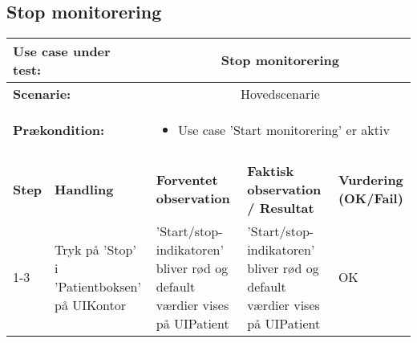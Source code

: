 \\
\subsection{Stop monitorering}
\begin{tabular}{|p{1cm}|p{3cm}|p{4cm}|p{4cm}|p{2cm}|}
\hline
\multicolumn{2}{|p{4cm}|}{\textbf{Use case under test:}} & \multicolumn{3}{c|}{Stop monitorering} \\\hline

\multicolumn{2}{|p{3cm}|}{\textbf{Scenarie:}} & \multicolumn{3}{c|}{Hovedscenarie} \\\hline

\multicolumn{2}{|p{3cm}|}{\textbf{Prækondition:}}  & \multicolumn{3}{l|}{\parbox{0.6\textwidth}{
\begin{itemize}[label=$\circ$]
\item Use case 'Start monitorering' er aktiv
\end{itemize} }}\\\hline

\multicolumn{5}{|c|}{} \\\hline

\textbf{Step} & \textbf{Handling} & \textbf{Forventet observation} & \textbf{Faktisk observation / Resultat} & \textbf{Vurdering (OK/Fail)}\\\hline

1-3 & Tryk på 'Stop' i 'Patientboksen' på UIKontor & 'Start/stop-indikatoren' bliver rød og default værdier vises på UIPatient & 'Start/stop-indikatoren' bliver rød og default værdier vises på UIPatient & OK \\\hline

\end{tabular}
\\
